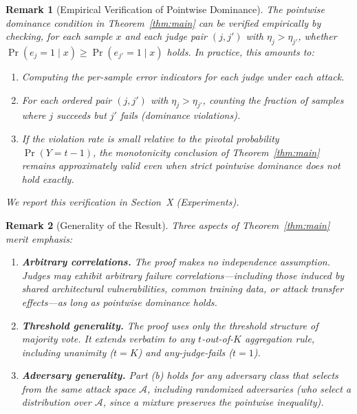 \documentclass[11pt]{article}
\newtheorem*{remark}{Remark}
\begin{document}
\begin{remark}[Empirical Verification of Pointwise Dominance]
The pointwise dominance condition in Theorem~\ref{thm:main} can be verified empirically by checking, for each sample $x$ and each judge pair $(j, j')$ with $\eta_j > \eta_{j'}$, whether $\Pr(e_j {=} 1 \mid x) \geq \Pr(e_{j'} {=} 1 \mid x)$ holds. In practice, this amounts to:
\begin{enumerate}
\item Computing the per-sample error indicators for each judge under each attack.
\item For each ordered pair $(j, j')$ with $\eta_j > \eta_{j'}$, counting the fraction of samples where $j$ succeeds but $j'$ fails (dominance violations).
\item If the violation rate is small relative to the pivotal probability $\Pr(Y = t{-}1)$, the monotonicity conclusion of Theorem~\ref{thm:main} remains approximately valid even when strict pointwise dominance does not hold exactly.
\end{enumerate}
We report this verification in Section~X (Experiments).
\end{remark}

\begin{remark}[Generality of the Result]
Three aspects of Theorem~\ref{thm:main} merit emphasis:
\begin{enumerate}[label=(\roman*)]
    \item \textbf{Arbitrary correlations.} The proof makes no independence assumption. Judges may exhibit arbitrary failure correlations---including those induced by shared architectural vulnerabilities, common training data, or attack transfer effects---as long as pointwise dominance holds.
    \item \textbf{Threshold generality.} The proof uses only the threshold structure of majority vote. It extends verbatim to any $t$-out-of-$K$ aggregation rule, including unanimity ($t = K$) and any-judge-fails ($t = 1$).
    \item \textbf{Adversary generality.} Part (b) holds for any adversary class that selects from the same attack space $\mathcal{A}$, including randomized adversaries (who select a distribution over $\mathcal{A}$, since a mixture preserves the pointwise inequality).
\end{enumerate}
\end{remark}
\end{document}
